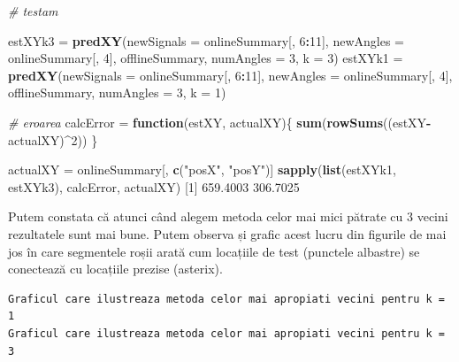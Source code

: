 \documentclass[]{article}
\newenvironment{Shaded}{\begin{snugshade}}{\end{snugshade}}
\newcommand{\KeywordTok}[1]{\textcolor[rgb]{0.13,0.29,0.53}{\textbf{#1}}}
\newcommand{\DataTypeTok}[1]{\textcolor[rgb]{0.13,0.29,0.53}{#1}}
\newcommand{\DecValTok}[1]{\textcolor[rgb]{0.00,0.00,0.81}{#1}}
\newcommand{\FloatTok}[1]{\textcolor[rgb]{0.00,0.00,0.81}{#1}}
\newcommand{\StringTok}[1]{\textcolor[rgb]{0.31,0.60,0.02}{#1}}
\newcommand{\CommentTok}[1]{\textcolor[rgb]{0.56,0.35,0.01}{\textit{#1}}}
\newcommand{\ControlFlowTok}[1]{\textcolor[rgb]{0.13,0.29,0.53}{\textbf{#1}}}
\newcommand{\OperatorTok}[1]{\textcolor[rgb]{0.81,0.36,0.00}{\textbf{#1}}}
\newcommand{\NormalTok}[1]{#1}
\begin{document}
\begin{Shaded}
\begin{Highlighting}[]
\CommentTok{# testam }

\NormalTok{estXYk3 =}\StringTok{ }\KeywordTok{predXY}\NormalTok{(}\DataTypeTok{newSignals =}\NormalTok{ onlineSummary[, }\DecValTok{6}\OperatorTok{:}\DecValTok{11}\NormalTok{], }
                 \DataTypeTok{newAngles =}\NormalTok{ onlineSummary[, }\DecValTok{4}\NormalTok{], }
\NormalTok{                 offlineSummary, }\DataTypeTok{numAngles =} \DecValTok{3}\NormalTok{, }\DataTypeTok{k =} \DecValTok{3}\NormalTok{)}
\NormalTok{estXYk1 =}\StringTok{ }\KeywordTok{predXY}\NormalTok{(}\DataTypeTok{newSignals =}\NormalTok{ onlineSummary[, }\DecValTok{6}\OperatorTok{:}\DecValTok{11}\NormalTok{], }
                 \DataTypeTok{newAngles =}\NormalTok{ onlineSummary[, }\DecValTok{4}\NormalTok{], }
\NormalTok{                 offlineSummary, }\DataTypeTok{numAngles =} \DecValTok{3}\NormalTok{, }\DataTypeTok{k =} \DecValTok{1}\NormalTok{)}

\CommentTok{# eroarea}
\NormalTok{calcError =}\StringTok{ }\ControlFlowTok{function}\NormalTok{(estXY, actualXY)\{}
  \KeywordTok{sum}\NormalTok{(}\KeywordTok{rowSums}\NormalTok{((estXY}\OperatorTok{-}\NormalTok{actualXY)}\OperatorTok{^}\DecValTok{2}\NormalTok{))}
\NormalTok{\}}

\NormalTok{actualXY =}\StringTok{ }\NormalTok{onlineSummary[, }\KeywordTok{c}\NormalTok{(}\StringTok{"posX"}\NormalTok{, }\StringTok{"posY"}\NormalTok{)]}
\KeywordTok{sapply}\NormalTok{(}\KeywordTok{list}\NormalTok{(estXYk1, estXYk3), calcError, actualXY)}
\NormalTok{[}\DecValTok{1}\NormalTok{] }\FloatTok{659.4003} \FloatTok{306.7025}
\end{Highlighting}
\end{Shaded}

Putem constata că atunci când alegem metoda celor mai mici pătrate cu 3
vecini rezultatele sunt mai bune. Putem observa și grafic acest lucru
din figurile de mai jos în care segmentele roșii arată cum locațiile de
test (punctele albastre) se conectează cu locațiile prezise (asterix).

\begin{verbatim}
Graficul care ilustreaza metoda celor mai apropiati vecini pentru k = 1
Graficul care ilustreaza metoda celor mai apropiati vecini pentru k = 3
\end{verbatim}
\end{document}
